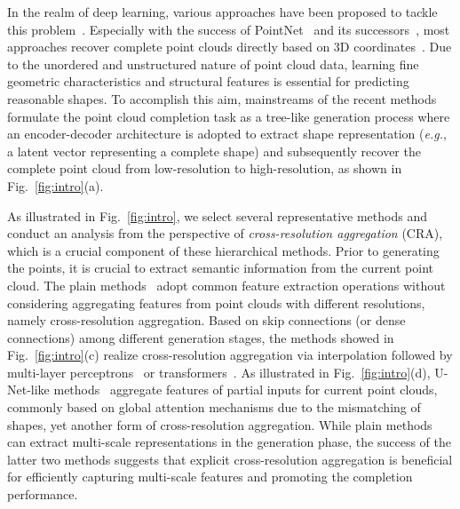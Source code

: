 \documentclass[letterpaper]{article} %
\begin{document}
In the realm of deep learning, various approaches have been proposed to tackle this problem~\cite{yang2018foldingnet, choy20163d, girdhar2016learning, xie2020grnet}. 
Especially with the success of PointNet~\cite{qi2017pointnet} and its successors~\cite{qi2017pointnet++,wang2019dynamic,zhao2021point}, most approaches recover complete point clouds directly based on  3D coordinates~\cite{yuan2018pcn, wen2020point, wen2021pmp, tchapmi2019topnet, yu2021pointr, wang2020cascaded}. 
Due to the unordered and unstructured nature of point cloud data, learning fine geometric characteristics and structural features is essential for predicting reasonable shapes. 
To accomplish this aim, mainstreams of the recent methods~\cite{xiang2021snowflakenet, zhou2022seedformer, huang2020pf, yan2022fbnet, huang2020pf, tang2022lake, wang2022learning} formulate the point cloud completion task as a tree-like generation process where an encoder-decoder architecture is  adopted to extract shape representation ({\em e.g.}, a latent vector representing a complete shape) and subsequently recover the complete point cloud from low-resolution to high-resolution, as shown in Fig.~\ref{fig:intro}(a). 

As illustrated in Fig.~\ref{fig:intro},  we select several representative methods and conduct an analysis from the perspective of {\em cross-resolution aggregation} (CRA), which is a crucial component of these hierarchical methods. 
Prior to generating the points, it is crucial to extract semantic information from the current point cloud.
The plain methods~\cite{yuan2018pcn, huang2020pf} adopt common feature extraction operations without considering aggregating features from point clouds with different resolutions, namely cross-resolution aggregation. 
Based on skip connections (or dense connections) among different generation stages, the methods showed in Fig.~\ref{fig:intro}(c) realize cross-resolution aggregation via interpolation followed by multi-layer perceptrons~\cite{yifan2019patch} or transformers~\cite{yan2022fbnet,  zhou2022seedformer}. 
As illustrated in Fig.~\ref{fig:intro}(d), U-Net-like methods~\cite{wen2020point, yu2021pointr} aggregate  features of partial inputs for current point clouds, commonly based on global attention mechanisms due to the mismatching of shapes, yet another form of cross-resolution aggregation.
While plain methods can extract multi-scale representations in the generation phase, the success of  the latter two methods suggests that explicit cross-resolution aggregation is beneficial for efficiently capturing multi-scale features and  promoting the completion performance. 
\end{document}
